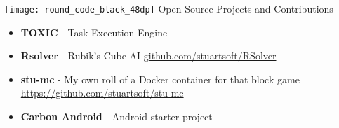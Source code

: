 {\noindent \texttt{[image: round\_code\_black\_48dp]} \hspace{0.25pc} \large Open Source Projects and Contributions}\hspace{1pc}{\noindent\rule{25pc}{0.4pt}}

\begin{itemize}
	\setlength{\itemsep}{0.0pc}
	\item[] \textbf{TOXIC} - Task Execution Engine
	
	\item[] \textbf{Rsolver} - Rubik's Cube AI \hspace{22.5pc} {\secondaryColor \href{https://www.github.com/stuartsoft/RSolver}{github.com/stuartsoft/RSolver}}
	
	\item[] \textbf{stu-mc} - My own roll of a Docker container for that block game\hspace{7.5pc} {\secondaryColor \href{github.com/stuartsoft/stu-mc}{https://github.com/stuartsoft/stu-mc}}
	
	\item[] \textbf{Carbon Android} - Android starter project\hspace{13.15pc}
	{}	
\end{itemize}
